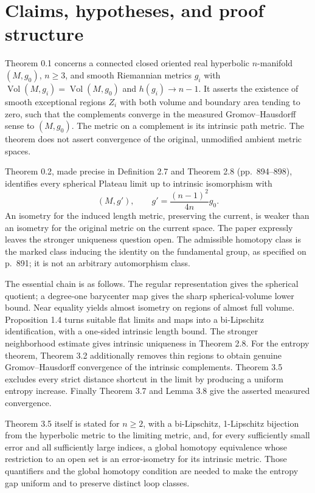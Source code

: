 \documentclass[10pt]{article}
\begin{document}
\section*{Claims, hypotheses, and proof structure}
Theorem 0.1 concerns a connected closed oriented real hyperbolic \(n\)-manifold \((M,g_0)\), \(n\geq3\), and smooth Riemannian metrics \(g_i\) with \(\operatorname{Vol}(M,g_i)=\operatorname{Vol}(M,g_0)\) and \(h(g_i)\to n-1\). It asserts the existence of smooth exceptional regions \(Z_i\) with both volume and boundary area tending to zero, such that the complements converge in the measured Gromov–Hausdorff sense to \((M,g_0)\). The metric on a complement is its intrinsic path metric. The theorem does not assert convergence of the original, unmodified ambient metric spaces.\par
Theorem 0.2, made precise in Definition 2.7 and Theorem 2.8 (pp. 894–898), identifies every spherical Plateau limit up to intrinsic isomorphism with \[\left(M,g'\right),\qquad
 g'=\frac{(n-1)^2}{4n}g_0 .\] An isometry for the induced length metric, preserving the current, is weaker than an isometry for the original metric on the current space. The paper expressly leaves the stronger uniqueness question open. The admissible homotopy class is the marked class inducing the identity on the fundamental group, as specified on p. 891; it is not an arbitrary automorphism class.\par
The essential chain is as follows. The regular representation gives the spherical quotient; a degree-one barycenter map gives the sharp spherical-volume lower bound. Near equality yields almost isometry on regions of almost full volume. Proposition 1.4 turns suitable flat limits and maps into a bi-Lipschitz identification, with a one-sided intrinsic length bound. The stronger neighborhood estimate gives intrinsic uniqueness in Theorem 2.8. For the entropy theorem, Theorem 3.2 additionally removes thin regions to obtain genuine Gromov–Hausdorff convergence of the intrinsic complements. Theorem 3.5 excludes every strict distance shortcut in the limit by producing a uniform entropy increase. Finally Theorem 3.7 and Lemma 3.8 give the asserted measured convergence.\par
Theorem 3.5 itself is stated for \(n\geq2\), with a bi-Lipschitz, 1-Lipschitz bijection from the hyperbolic metric to the limiting metric, and, for every sufficiently small error and all sufficiently large indices, a global homotopy equivalence whose restriction to an open set is an error-isometry for its intrinsic metric. Those quantifiers and the global homotopy condition are needed to make the entropy gap uniform and to preserve distinct loop classes.\par
\end{document}
